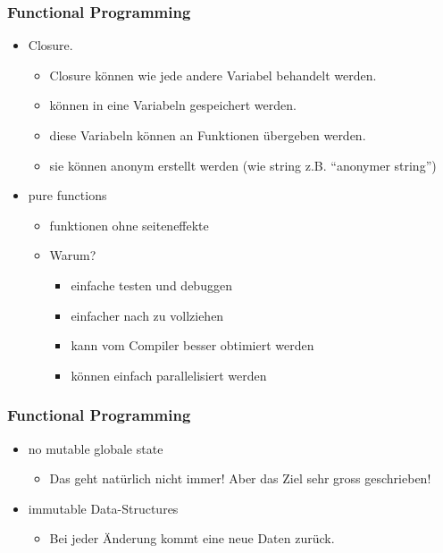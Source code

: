 \documentclass[compress, blue]{beamer}
\begin{document}
\begin{frame}\frametitle{Functional Programming}
  \begin{itemize}
  \item Closure.\pause
    \begin{itemize}
      \item Closure können wie jede andere Variabel behandelt werden.\pause
      \item können in eine Variabeln gespeichert werden.\pause
      \item diese Variabeln können an Funktionen übergeben werden.\pause
      \item sie können anonym erstellt werden (wie string
        z.B. ``anonymer string'') \pause
    \end{itemize}
  \end{itemize}

  \begin{itemize}
  \item pure functions \pause
    \begin{itemize}
       \item funktionen ohne  seiteneffekte \pause
       \item Warum? \pause
         \begin{itemize}
          \item einfache testen und debuggen \pause
          \item einfacher nach zu vollziehen \pause
          \item kann vom Compiler besser obtimiert werden \pause
          \item können einfach parallelisiert werden \pause
         \end{itemize}
    \end{itemize}
  \end{itemize}
\end{frame}


\begin{frame}\frametitle{Functional Programming}
  \begin{itemize}
  \item no mutable globale state \pause
    \begin{itemize}
       \item Das geht natürlich nicht immer! Aber das Ziel sehr gross
         geschrieben! \pause
    \end{itemize}
  \end{itemize}

  \begin{itemize}
  \item immutable Data-Structures \pause
    \begin{itemize}
       \item Bei jeder Änderung kommt eine neue Daten
         zurück.\pause
    \end{itemize}
  \end{itemize}
\end{frame}
\end{document}
